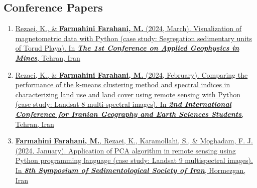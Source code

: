 \documentclass[letterpaper,11pt]{article}
\begin{document}
	\subsection*{Conference Papers}
	\begin{enumerate}[label=\arabic*.,left=0pt,topsep=7.5pt,partopsep=0pt,itemsep=3.5pt,parsep=0pt]
		\item \href{https://www.researchgate.net/publication/378739800_Visualization_of_magnetometric_data_with_Python_case_study_Segregation_sedimentary_units_of_Torud_Playa?_sg%5B0%5D=LoPp16VH0-6l0fXCdjovY4qsKuuoBEjgL0erfoZR4Uu8OgKpJLTjo-i0ER6DJQvtxV5yn-6F_LjppW5y3_P8-rhUY1Iw0vsVNspav0fh.6VV6-YV9qqXIscybiYu4WPY6XDq3G_GtZ2_dwcU75rr-MDSamPnew9PxJPwXeni5MqqF4VPfzeTeaEakSNpS3g&_tp=eyJjb250ZXh0Ijp7ImZpcnN0UGFnZSI6ImhvbWUiLCJwYWdlIjoicHJvZmlsZSIsInByZXZpb3VzUGFnZSI6InByb2ZpbGUiLCJwb3NpdGlvbiI6InBhZ2VDb250ZW50In19}{Rezaei, K., \& \textbf{Farmahini Farahani, M.} (2024, March). Visualization of magnetometric data with Python (case study: Segregation sedimentary units of Torud Playa). In \textit{\textbf{The 1st Conference on Applied Geophysics in Mines}}, Tehran, Iran}
		\item \href{https://www.researchgate.net/publication/378307658_Comparing_the_performance_of_the_k-means_clustering_method_and_spectral_indices_in_characterizing_land_use_and_land_cover_using_remote_sensing_with_Python_case_study_Landsat_8_multi-spectral_images}{Rezaei, K., \& \textbf{Farmahini Farahani, M.} (2024, February). Comparing the performance of the k-means clustering method and spectral indices in characterizing land use and land cover using remote sensing with Python (case study: Landsat 8 multi-spectral images). In \textit{\textbf{2nd International Conference for Iranian Geography and Earth Sciences Students}}, Tehran, Iran} 
		\item \href{https://www.researchgate.net/publication/377838524_Application_of_PCA_algorithm_in_remote_sensing_using_Python_programming_language_case_study_Landsat_9_multispectral_images?_sg%5B0%5D=LoPp16VH0-6l0fXCdjovY4qsKuuoBEjgL0erfoZR4Uu8OgKpJLTjo-i0ER6DJQvtxV5yn-6F_LjppW5y3_P8-rhUY1Iw0vsVNspav0fh.6VV6-YV9qqXIscybiYu4WPY6XDq3G_GtZ2_dwcU75rr-MDSamPnew9PxJPwXeni5MqqF4VPfzeTeaEakSNpS3g&_tp=eyJjb250ZXh0Ijp7ImZpcnN0UGFnZSI6ImhvbWUiLCJwYWdlIjoicHJvZmlsZSIsInByZXZpb3VzUGFnZSI6InByb2ZpbGUiLCJwb3NpdGlvbiI6InBhZ2VDb250ZW50In19}{\textbf{Farmahini Farahani, M.}, Rezaei, K., Karamollahi, S., \& Moghadam, F. J. (2024, January). Application of PCA algorithm in remote sensing using Python programming language (case study: Landsat 9 multispectral images). In \textit{\textbf{8th Symposium of Sedimentological Society of Iran}}, Hormezgan, Iran}

\end{enumerate}
\end{document}

